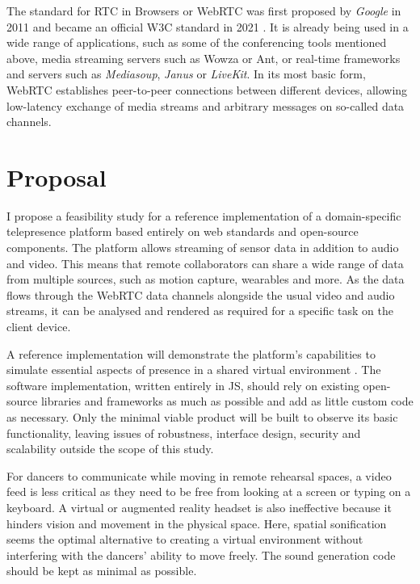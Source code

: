 The standard for \ac{RTC} in Browsers or \ac{WebRTC} \parencite{webRtcSpec} was first proposed by \emph{Google} in 2011 and became an official \ac{W3C} standard in 2021 \parencite{webRtcOfficialWebStandard}. It is already being used in a wide range of applications, such as some of the conferencing tools mentioned above, media streaming servers such as Wowza or Ant, or real-time frameworks and servers such as \emph{Mediasoup}, \emph{Janus} or \emph{LiveKit}. In its most basic form, \ac{WebRTC} establishes peer-to-peer connections between different devices, allowing low-latency exchange of media streams and arbitrary messages on so-called data channels.

\section{Proposal}

I propose a feasibility study for a reference implementation of a domain-specific telepresence platform based entirely on web standards and open-source components. The platform allows streaming of sensor data in addition to audio and video. This means that remote collaborators can share a wide range of data from multiple sources, such as motion capture, wearables and more. As the data flows through the WebRTC data channels alongside the usual video and audio streams, it can be analysed and rendered as required for a specific task on the client device.

A reference implementation will demonstrate the platform's capabilities to simulate essential aspects of presence in a shared virtual environment \parencite{surveyOfPresence}. The software implementation, written entirely in \ac{JS}, should rely on existing open-source libraries and frameworks as much as possible and add as little custom code as necessary. Only the minimal viable product will be built to observe its basic functionality, leaving issues of robustness, interface design, security and scalability outside the scope of this study.

For dancers to communicate while moving in remote rehearsal spaces, a video feed is less critical as they need to be free from looking at a screen or typing on a keyboard. A virtual or augmented reality headset is also ineffective because it hinders vision and movement in the physical space. Here, spatial sonification seems the optimal alternative to creating a virtual environment without interfering with the dancers' ability to move freely. The sound generation code should be kept as minimal as possible.

